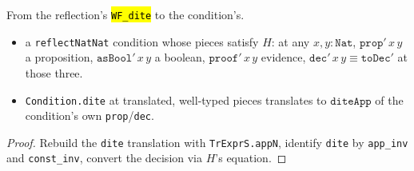 \begin{theorem}
  \label{prim-cond:thm:condition-reflect-dite}
  \leanok

   From the reflection's \hl{\texttt{WF\_dite}} to the condition's.
  \begin{itemize}
  \item {} a \texttt{reflectNatNat} condition whose pieces satisfy $H$: at any $x, y :
    \mathtt{Nat}$, $\mathtt{prop}'\,x\,y$ a proposition, $\mathtt{asBool}'\,x\,y$ a boolean,
    $\mathtt{proof}'\,x\,y$ evidence, $\mathtt{dec}'\,x\,y \equiv \mathtt{toDec}'$ at those three.
  \item {} \texttt{Condition.dite} at translated, well-typed pieces translates to
    $\mathtt{diteApp}$ of the condition's own \texttt{prop}/\texttt{dec}.
  \end{itemize}
\end{theorem}
\begin{proof}
  \leanok
   Rebuild the \texttt{dite} translation with \texttt{TrExprS.appN}, identify
  \texttt{dite} by \texttt{app\_inv} and \texttt{const\_inv}, convert the decision via $H$'s
  equation.
\end{proof}

